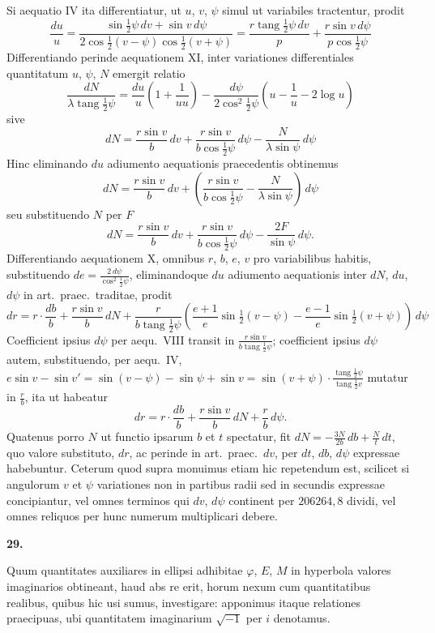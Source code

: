 \documentclass[12pt,a4paper]{book}
\newcommand{\tang}{\operatorname{tang}}
\begin{document}
Si aequatio IV ita differentiatur, ut $u$, $v$, $\psi$ simul ut variabiles tractentur, prodit
\[
\frac{du}{u}=\frac{\sin\tfrac{1}{2}\psi\,dv+\sin v\,d\psi}{2\cos\tfrac{1}{2}(v-\psi)\cos\tfrac{1}{2}(v+\psi)}=\frac{r\tang\tfrac{1}{2}\psi\,dv}{p}+\frac{r\sin v\,d\psi}{p\cos\tfrac{1}{2}\psi}
\]
Differentiando perinde aequationem XI, inter variationes differentiales quantitatum $u$, $\psi$, $N$ emergit relatio
\[
\frac{dN}{\lambda\tang\tfrac{1}{2}\psi}=\frac{du}{u}\left(1+\frac{1}{uu}\right)-\frac{d\psi}{2\cos^{2}\tfrac{1}{2}\psi}\left(u-\frac{1}{u}-2\log u\right)
\]
sive
\[
dN=\frac{r\sin v}{b}\,dv+\frac{r\sin v}{b\cos\tfrac{1}{2}\psi}\,d\psi-\frac{N}{\lambda\sin\psi}\,d\psi
\]
Hinc eliminando $du$ adiumento aequationis praecedentis obtinemus
\[
dN=\frac{r\sin v}{b}\,dv+\left(\frac{r\sin v}{b\cos\tfrac{1}{2}\psi}-\frac{N}{\lambda\sin\psi}\right)\,d\psi
\]
seu substituendo $N$ per $F$
\[
dN=\frac{r\sin v}{b}\,dv+\frac{r\sin v}{b\cos\tfrac{1}{2}\psi}\,d\psi-\frac{2F}{\sin\psi}\,d\psi.
\]
Differentiando aequationem X, omnibus $r$, $b$, $e$, $v$ pro variabilibus habitis, substituendo $de=\frac{2\,d\psi}{\cos^{2}\tfrac{1}{2}\psi}$, eliminandoque $du$ adiumento aequationis inter $dN$, $du$, $d\psi$ in art.~praec.~traditae, prodit
\[
dr=r\cdot\frac{db}{b}+\frac{r\sin v}{b}\,dN+\frac{r}{b\tang\tfrac{1}{2}\psi}\left(\frac{e+1}{e}\sin\tfrac{1}{2}(v-\psi)-\frac{e-1}{e}\sin\tfrac{1}{2}(v+\psi)\right)\,d\psi
\]
Coefficient ipsius $d\psi$ per aequ.~VIII transit in $\frac{r\sin v}{b\tang\tfrac{1}{2}\psi}$; coefficient ipsius $d\psi$ autem, substituendo, per aequ.~IV, $e\sin v-\sin v'=\sin(v-\psi)-\sin\psi+\sin v=\sin(v+\psi)\cdot\frac{\tang\tfrac{1}{2}\psi}{\tang\tfrac{1}{2}v}$ mutatur in $\frac{r}{b}$, ita ut habeatur
\[
dr=r\cdot\frac{db}{b}+\frac{r\sin v}{b}\,dN+\frac{r}{b}\,d\psi.
\]
Quatenus porro $N$ ut functio ipsarum $b$ et $t$ spectatur, fit $dN=-\frac{3N}{2b}\,db+\frac{N}{t}\,dt$, quo valore substituto, $dr$, ac perinde in art.~praec.~$dv$, per $dt$, $db$, $d\psi$ expressae habebuntur. Ceterum quod supra monuimus etiam hic repetendum est, scilicet si angulorum $v$ et $\psi$ variationes non in partibus radii sed in secundis expressae concipiantur, vel omnes terminos qui $dv$, $d\psi$ continent per $206264{,}8$ dividi, vel omnes reliquos per hunc numerum multiplicari debere.

\textbf{29.}

Quum quantitates auxiliares in ellipsi adhibitae $\varphi$, $E$, $M$ in hyperbola valores imaginarios obtineant, haud abs re erit, horum nexum cum quantitatibus realibus, quibus hic usi sumus, investigare: apponimus itaque relationes praecipuas, ubi quantitatem imaginarium $\sqrt{-1}$ per $i$ denotamus.
\end{document}
